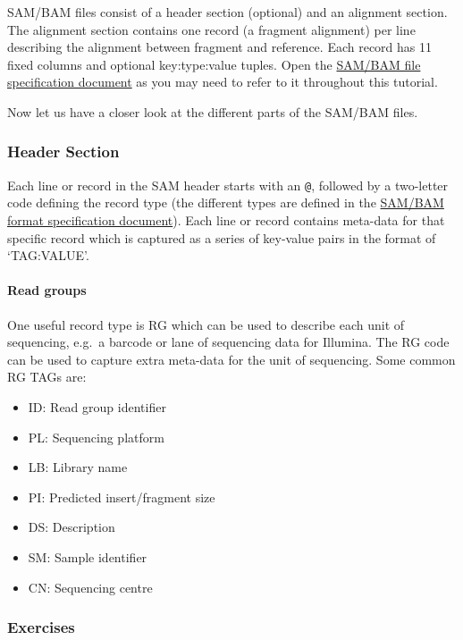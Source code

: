 \documentclass[11pt]{article}
\providecommand{\tightlist}{%
      \setlength{\itemsep}{0pt}\setlength{\parskip}{0pt}}
\begin{document}
SAM/BAM files consist of a header section (optional) and an alignment
section. The alignment section contains one record (a fragment
alignment) per line describing the alignment between fragment and
reference. Each record has 11 fixed columns and optional key:type:value
tuples. Open the
\href{https://samtools.github.io/hts-specs/SAMv1.pdf}{SAM/BAM file
specification document} as you may need to refer to it throughout this
tutorial.

Now let us have a closer look at the different parts of the SAM/BAM
files.

\hypertarget{header-section}{%
\subsubsection{Header Section}\label{header-section}}

Each line or record in the SAM header starts with an \texttt{@},
followed by a two-letter code defining the record type (the different
types are defined in the
\href{https://samtools.github.io/hts-specs/SAMv1.pdf}{SAM/BAM format
specification document}). Each line or record contains meta-data for
that specific record which is captured as a series of key-value pairs in
the format of `TAG:VALUE'.

\hypertarget{read-groups}{%
\paragraph{Read groups}\label{read-groups}}

One useful record type is RG which can be used to describe each unit of
sequencing, e.g.~a barcode or lane of sequencing data for Illumina. The
RG code can be used to capture extra meta-data for the unit of
sequencing. Some common RG TAGs are:

\begin{itemize}
\tightlist
\item
  ID: Read group identifier
\item
  PL: Sequencing platform
\item
  LB: Library name
\item
  PI: Predicted insert/fragment size
\item
  DS: Description
\item
  SM: Sample identifier
\item
  CN: Sequencing centre
\end{itemize}

    \hypertarget{exercises}{%
\subsubsection{Exercises}\label{exercises}}
\end{document}

